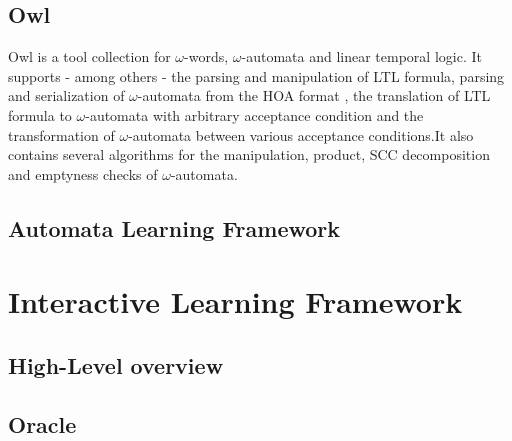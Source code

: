 \subsection{Owl} \label{subsec_owl}

Owl \cite{Owl} is a tool collection for $\omega$-words, $\omega$-automata and linear temporal logic. It supports - among others - the parsing and manipulation of LTL formula, parsing and serialization of $\omega$-automata from the HOA format \cite{HOAFormat}, the translation of LTL formula to $\omega$-automata with arbitrary acceptance condition and the transformation of $\omega$-automata between various acceptance conditions.It also contains several algorithms for the manipulation, product, SCC decomposition and emptyness checks of $\omega$-automata.

\subsection{Automata Learning Framework} \label{subsec_automatonlearning}

\section{Interactive Learning Framework} \label{sec_interactivelearningframework}

\subsection{High-Level overview} \label{subsec_highleveloverview}

\subsection{Oracle} \label{subsec_oracleimpl}

